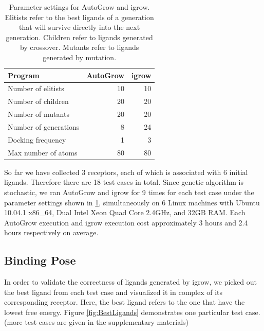 \documentclass[10pt,conference,letterpaper]{IEEEtran}
\begin{document}
\begin{table}
\centering
\begin{tabular}
{lrr}
\noalign{\smallskip}\toprule
Program & AutoGrow & igrow\\
\midrule
\noalign{\smallskip}
Number of elitists & 10 & 10\\
Number of children & 20 & 20\\
Number of mutants & 20 & 20\\
Number of generations & 8 & 24\\
Docking frequency & 1 & 3\\
Max number of atoms & 80 & 80\\
\bottomrule
\end{tabular}
\caption{Parameter settings for AutoGrow and igrow. Elitists refer to the best ligands of a generation that will survive directly into the next generation. Children refer to ligands generated by crossover. Mutants refer to ligands generated by mutation.}
\label{tab:ParameterSettings}
\end{table}

So far we have collected 3 receptors, each of which is associated with 6 initial ligands. Therefore there are 18 test cases in total.
Since genetic algorithm is stochastic, we ran AutoGrow and igrow for 9 times for each test case under the parameter settings shown in \ref{tab:ParameterSettings}, simultaneously on 6 Linux machines with Ubuntu 10.04.1 x86\_64, Dual Intel Xeon Quad Core 2.4GHz, and 32GB RAM.
Each AutoGrow execution and igrow execution cost approximately 3 hours and 2.4 hours respectively on average.

\subsection{Binding Pose}
In order to validate the correctness of ligands generated by igrow, we picked out the best ligand from each test case and visualized it in complex of its corresponding receptor.
Here, the best ligand refers to the one that have the lowest free energy.
Figure \ref{fig:BestLigands} demonstrates one particular test case.
(more test cases are given in the supplementary materials)
\end{document}
